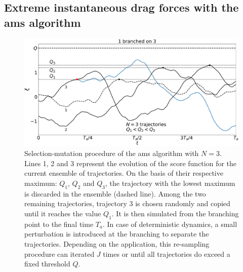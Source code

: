 \documentclass[pre,aps,floatfix,10pt,superscriptaddress, notitlepage,preprint]{revtex4-1}
\begin{document}
\subsection{Extreme instantaneous drag forces with the \acl{ams} algorithm}
\label{sec:ams}

\begin{figure}
  \centering
  \includegraphics[width=\linewidth]{illustr_AMS/illustr_AMS}
  \caption{\label{fig:illustr_AMS} Selection-mutation procedure of the \ac{ams} algorithm with $N=3$. Lines 1, 2 and 3 represent the evolution of the score function for the current ensemble of trajectories. On the basis of their respective maximum: $Q_1$, $Q_2$ and $Q_3$, the trajectory with the lowest maximum is discarded in the ensemble (dashed line). Among the two remaining trajectories, trajectory 3 is chosen randomly and copied until it reaches the value $Q_1$. It is then simulated from the branching point to the final time $T_a$. In case of deterministic dynamics, a small perturbation is introduced at the branching to separate the trajectories. Depending on the application, this re-sampling procedure can iterated $J$ times or until all trajectories do exceed a fixed threshold $Q$.}
\end{figure}
\end{document}
